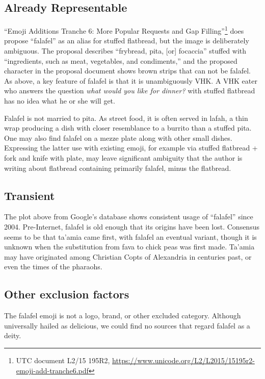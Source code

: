 \documentclass[a4paper,10pt]{article}
\begin{document}
\subsection{Already Representable}

``Emoji Additions Tranche 6: More Popular Requests
and Gap Filling''\footnote{UTC document L2/15 195R2,
\url{https://www.unicode.org/L2/L2015/15195r2-emoji-add-tranche6.pdf}} does propose
``falafel'' as an alias for {\sc stuffed flatbread}, but the image is deliberately ambiguous. The proposal describes
``frybread, pita, [or] focaccia'' stuffed with ``ingredients, such as meat, vegetables,
and condiments,'' and the proposed character in the proposal document shows brown strips that
can not be falafel.  As above, a key feature of falafel is that it is unambiguously VHK.
A VHK eater who answers the question {\em what would you like for dinner?} with {\sc
stuffed flatbread} has no idea what he or she will get.

Falafel is not married to pita. As street food, it is often served in lafah,
a thin wrap producing a dish with closer resemblance to a burrito than a
stuffed pita. One may also find falafel on a mezze plate along with other small
dishes. Expressing the latter use with existing emoji, for example via {\sc stuffed
flatbread + fork and knife with plate}, may leave significant ambiguity that the author
is writing about flatbread containing primarily falafel, minus the flatbread.

\subsection{Transient}

The plot above from Google's database shows consistent usage of ``falafel'' 
since 2004. Pre-Internet, falafel is old enough that its
origins have been lost. Consensus seems to be that ta'amia came first, with falafel an
eventual variant, though it is unknown when the substitution from fava to chick peas
was first made.  Ta'amia may have originated among Christian Copts of Alexandria in
centuries past, or even the times of the pharaohs.

\subsection{Other exclusion factors}
The {\sc falafel} emoji is not a logo, brand, or other excluded category. Although
universally hailed as delicious, we could find no sources that regard falafel as a deity.
\end{document}
